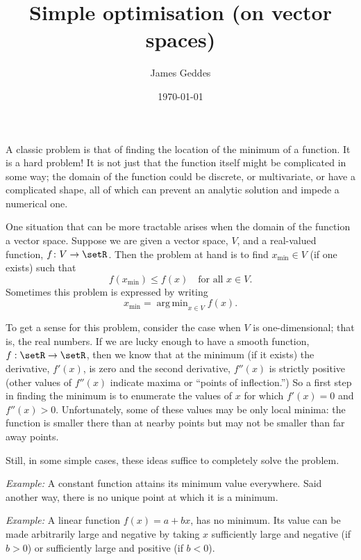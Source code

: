 \documentclass[10pt, a4paper]{article}
\title{Simple optimisation (on vector spaces)}
\author{James Geddes}
\date{\today}
\DeclareMathOperator*{\argmin}{arg\,min}
\newcommand{\eg}{\emph{Example:}}
\begin{document}
\maketitle

A classic problem is that of finding the location of the minimum of a
function. It is a hard problem! It is not just that the function
itself might be complicated in some way; the domain of the function
could be discrete, or multivariate, or have a complicated shape, all
of which can prevent an analytic solution and impede a numerical one.

One situation that can be more tractable arises when the domain of the
function a vector space. Suppose we are given a vector space, $V$, and
a real-valued function, $f\colon V\to \setR$. Then the problem at hand
is to find $x_\text{min}\in V$ (if one exists) such that
\begin{equation*}
 f(x_\text{min}) \leq f(x) \quad\text{for all $x\in V$}.  
\end{equation*}
Sometimes this problem is expressed by writing
\begin{equation*}
  x_\text{min} = \argmin_{x\in V} f(x).
\end{equation*}

To get a sense for this problem, consider the case when $V$ is
one-dimensional; that is, the real numbers. If we are lucky enough to
have a smooth function, $f:\setR\to\setR$, then we know that at the
minimum (if it exists) the derivative, $f'(x)$, is zero and the second
derivative, $f''(x)$ is strictly positive (other values of $f''(x)$
indicate maxima or “points of inflection.”) So a first step in finding
the minimum is to enumerate the values of $x$ for which $f'(x) = 0$
and $f''(x)>0$. Unfortunately, some of these values may be only local
minima: the function is smaller there than at nearby points but may
not be smaller than far away points.

Still, in some simple cases, these ideas suffice to completely solve
the problem.

\eg{} A constant function attains its minimum value everywhere. Said
another way, there is no unique point at which it is a minimum.

\eg{} A linear function $f(x) = a + bx$, has no
minimum. Its value can be made arbitrarily large and
negative by taking $x$ sufficiently large and negative (if $b>0$) or
sufficiently large and positive (if $b<0$).
\end{document}

